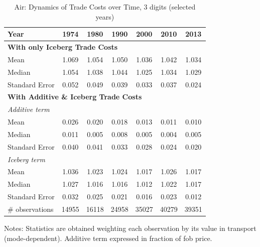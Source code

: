 \documentclass[a4paper,11pt]{article}
\begin{document}
\begin{table}[htbp]
  \centering
  \caption{Air: Dynamics of Trade Costs over Time, 3 digits (selected years)}
\begin{center}
    \begin{tabular}{l|cccccc}
\hline\hline

Year & 1974  & 1980  & 1990  & 2000  & 2010  & 2013   \\ \hline
\multicolumn{7}{l}{\textbf{With only Iceberg Trade Costs}}     \\
Mean  & 1.069 & 1.054 & 1.050 & 1.036 & 1.042 & 1.034  \\
Median & 1.054 & 1.038 & 1.044 & 1.025 & 1.034 & 1.029  \\
Standard Error & 0.052 & 0.049 & 0.039 & 0.033 & 0.037 & 0.024 \\
\hline
\multicolumn{7}{l}{\textbf{With Additive \& Iceberg Trade Costs }}    \\
\multicolumn{1}{l}{\textit{Additive term }} &       &       &       &       &       &      \\
\multicolumn{1}{l}{Mean } & 0.026 & 0.020 & 0.018 & 0.013 & 0.011 & 0.010  \\
\multicolumn{1}{l}{Median} & 0.011 & 0.005 & 0.008 & 0.005 & 0.004 & 0.005  \\
\multicolumn{1}{l}{Standard Error} & 0.040 & 0.041 & 0.033 & 0.028 & 0.024 & 0.020  \\
\multicolumn{1}{l}{\textit{Iceberg term}} &       &       &       &       &       &        \\
\multicolumn{1}{l}{Mean } & 1.036 & 1.023 & 1.024 & 1.017 & 1.026 & 1.017  \\
\multicolumn{1}{l}{Median} & 1.027 & 1.016 & 1.016 & 1.012 & 1.022 & 1.017 \\
Standard Error & 0.032 & 0.025 & 0.021 & 0.016 & 0.023 & 0.012  \\ \hline
\# observations & 14955 & 16118 & 24958 & 35027 & 40279 & 39351  \\ 
\hline\hline
    \end{tabular}%
  \end{center}
  \label{tab:result_air_3d_detail}%
\tiny{Notes: Statistics are obtained weighting each observation by its value in transport (mode-dependent). Additive term expressed in fraction of fob price. }
\end{table}%
\end{document}
